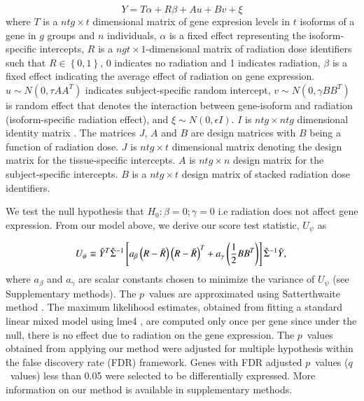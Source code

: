 \documentclass[hidelinks,11pt]{article}
\begin{document}
\begin{equation}
Y = T \alpha + R\beta + Au + Bv + \xi
\end{equation}
where $T$ is a $ntg \times t$ dimensional matrix of gene expresion levels in $t$ isoforms of a gene in $g$ groups and $n$ individuals, $\alpha$ is a fixed effect representing the isoform-specific intercepts, $R$ is a $ngt \times 1$-dimensional matrix of radiation dose identifiers such that $R\in\left\{0,1\right\}$, 0 indicates no radiation and 1 indicates radiation, $\beta$ is a fixed effect indicating the average effect of radiation on gene expression. $u \sim N\left(0, \tau AA^T \right)$ indicates subject-specific random intercept, $v \sim N\left(0,\gamma BB^T \right)$ is random effect that denotes the interaction between gene-isoform and radiation (isoform-specific radiation effect), and $\xi \sim N\left(0, \epsilon I \right)$. $I$ is $ntg \times ntg$ dimensional identity matrix . The matrices $J$, $A$ and $B$ are design matrices with $B$ being a function of radiation dose. $J$ is $ntg \times t$ dimensional matrix denoting the design matrix for the tissue-specific intercepts. $A$ is $ntg \times n$ design matrix for the subject-specific intercepts. $B$ is a $ntg \times t$ design matrix of stacked radiation dose identifiers.

We test the null hypothesis that  $H_0: \beta = 0; \gamma=0$ i.e radiation does not affect gene expression. From our model above, we derive our score test statistic, $U_\psi$ as

\begin{equation}
U_\psi \equiv \hat{Y}^T  \hat{\Sigma}^{-1} \left[ a_\beta \left(R - \bar{R} \right) \left(R - \bar{R} \right)^T   + a_\gamma \left( \frac{1}{2} B B^T \right) \right]  \hat{\Sigma}^{-1} \hat{Y}, \\
\end{equation}
where ${a_\beta}$ and ${a_\gamma}$ are scalar constants chosen to minimize the variance of $U_\psi$ (see Supplementary methods). The $p$~values are approximated using Satterthwaite method \cite{satterthwaite}. The maximum likelihood estimates, obtained from fitting a standard linear mixed model using lme4 \cite{lme4}, are computed only once per gene since under the null, there is no effect due to radiation on the gene expression. The $p$~values obtained from applying our method were adjusted for multiple hypothesis within the false discovery rate (FDR) framework. Genes with FDR adjusted $p$~values ($q$~values) less than 0.05 were selected to be differentially expressed. More information on our method is available in supplementary methods. 
\end{document}

